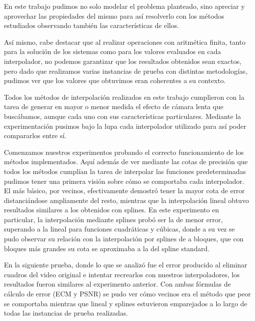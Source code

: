 \setlength{\parindent}{15.0pt} %
En este trabajo pudimos no solo modelar el problema planteado, sino
apreciar y aprovechar las propiedades del mismo para así resolverlo con los
métodos estudiados observando también las características de ellos.

Así mismo, cabe destacar que al realizar operaciones con aritmética finita,
tanto para la solución de los sistemas como para los valores evaluados en cada
interpolador, no podemos garantizar que los resultados obtenidos sean exactos,
pero dado que realizamos varias instancias de prueba con distintas metodologías,
pudimos ver que los valores que obtuvimos eran coherentes a su contexto.

Todos los métodos de interpolación realizados en este trabajo cumplieron con la
tarea de generar en mayor o menor medida el efecto de cámara lenta que
buscábamos, aunque cada uno con sus características particulares. Mediante la
experimentación pusimos bajo la lupa cada interpolador utilizado para así poder
compararlos entre sí.

Comenzamos nuestros experimentos probando el correcto funcionamiento de los
métodos implementados. Aquí además de ver mediante las cotas de precisión que
todos los métodos cumplían la tarea de interpolar las funciones predeterminadas
pudimos tener una primera visión sobre cómo se comportaba cada interpolador. El
más básico, por vecinos, efectivamente demostró tener la mayor cota de error
distanciándose ampliamente del resto, mientras que la interpolación lineal
obtuvo resultados similares a los obtenidos con splines. En este experimento en
particular, la interpolación mediante splines probó ser la de menor error,
superando a la lineal para funciones cuadráticas y cúbicas, donde a su vez se
pudo observar su relación con la interpolación por splines de a bloques, que con
bloques más grandes su cota se aproximaba a la del spline standard.

En la siguiente prueba, donde lo que se analizó fue el error producido al
eliminar cuadros del video original e intentar recrearlos con nuestros
interpoladores, los resultados fueron similares al experimento anterior. Con
ambas fórmulas de cálculo de error (ECM y PSNR) se pudo ver cómo vecinos era el
método que peor se comportaba mientras que lineal y splines estuvieron
emparejados a lo largo de todas las instancias de prueba realizadas.

